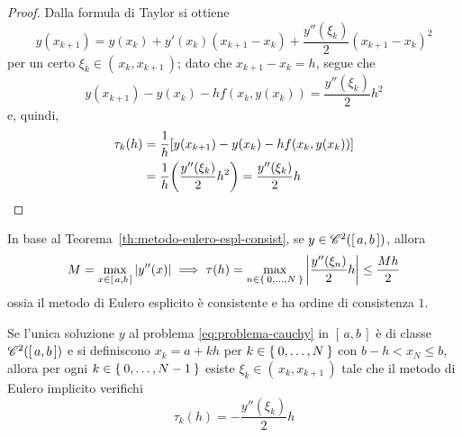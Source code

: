 	\begin{proof}
		Dalla formula di Taylor si ottiene
		\begin{equation*}
			y (x_{k + 1}) = y (x_k) + y' (x_k) (x_{k + 1} - x_k) + \frac{y'' (\xi_k)}{2} (x_{k + 1} - x_k)^2
		\end{equation*}
		per un certo \(\xi_k \in (\, x_k, x_{k + 1} \,)\); dato che \(x_{k + 1} - x_k = h\), segue che
		\begin{equation*}
			y (x_{k + 1}) - y (x_k) - h f (x_k, y (x_k)) = \frac{y'' (\xi_k)}{2} h^2
		\end{equation*}
		e, quindi,
		\begin{equation*}
			\begin{split}
				\tau_k (h) &= \frac{1}{h} \qty[y (x_{k + 1}) - y (x_k) - h f (x_k, y (x_k))] \\
				&= \frac{1}{h} \qty(\frac{y'' (\xi_k)}{2} h^2) = \frac{y'' (\xi_k)}{2} h \qedhere
			\end{split}
		\end{equation*}
	\end{proof}

	\begin{osservazione}
		In base al Teorema~\ref{th:metodo-eulero-espl-consist}, se \(y \in \mathscr{C}^2 ([\, a, b \,])\), allora
		\begin{equation*}
			M = \max_{x \in [\, a, b \,]} \abs{y'' (x)} \implies \tau (h) = \max_{n \in \Set{0, \dots, N}} \abs{\frac{y'' (\xi_n)}{2} h} \le \frac{M h}{2}
		\end{equation*}
		ossia il metodo di Eulero esplicito è consistente e ha ordine di consistenza \(1\).
	\end{osservazione}

	\begin{teorema}\label{th:metodo-eulero-impl-consist}
		Se l'unica soluzione \(y\) al problema \eqref{eq:problema-cauchy} in \([\, a, b \,]\) è di classe \(\mathscr{C}^2 ([\, a, b \,])\) e si definiscono \(x_k = a + k h\) per \(k \in \Set{0, \dots, N}\) con \(b - h < x_N \le b\), allora per ogni \(k \in \Set{0, \dots, N - 1}\) esiste \(\xi_k \in (\, x_k, x_{k + 1} \,)\) tale che il metodo di Eulero implicito verifichi
		\begin{equation}\label{eq:metodo-eulero-impl-consist}
			\tau_k (h) = - \frac{y'' (\xi_k)}{2} h
		\end{equation}
	\end{teorema}

